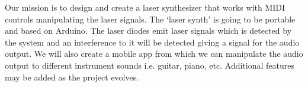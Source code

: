 Our mission is to design and create a laser synthesizer that works with MIDI controls manipulating the laser signals. The ‘laser synth’ is going to be portable and based on Arduino. The laser diodes emit laser signals which is detected by the system and an interference to it will be detected giving a signal for the audio output. We will also create a mobile app from which we can manipulate the audio output to different instrument sounds i.e. guitar, piano, etc. Additional features may be added as the project evolves.
